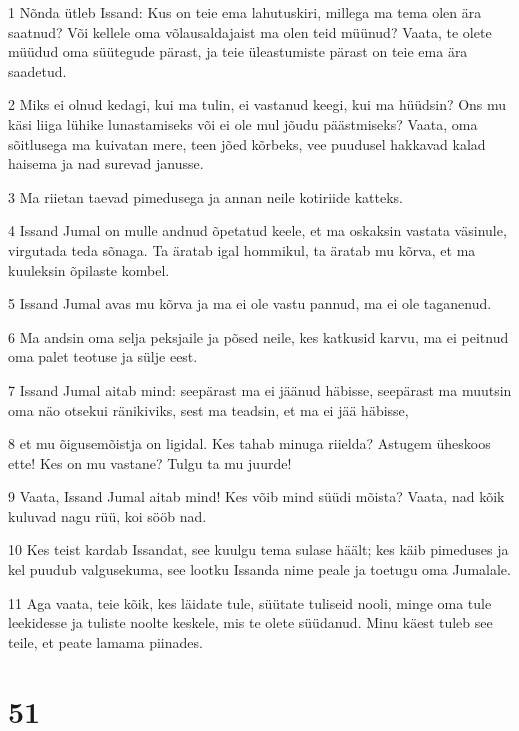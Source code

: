 \par 1 Nõnda ütleb Issand: Kus on teie ema lahutuskiri, millega ma tema olen ära saatnud? Või kellele oma võlausaldajaist ma olen teid müünud? Vaata, te olete müüdud oma süütegude pärast, ja teie üleastumiste pärast on teie ema ära saadetud.
\par 2 Miks ei olnud kedagi, kui ma tulin, ei vastanud keegi, kui ma hüüdsin? Ons mu käsi liiga lühike lunastamiseks või ei ole mul jõudu päästmiseks? Vaata, oma sõitlusega ma kuivatan mere, teen jõed kõrbeks, vee puudusel hakkavad kalad haisema ja nad surevad janusse.
\par 3 Ma riietan taevad pimedusega ja annan neile kotiriide katteks.
\par 4 Issand Jumal on mulle andnud õpetatud keele, et ma oskaksin vastata väsinule, virgutada teda sõnaga. Ta äratab igal hommikul, ta äratab mu kõrva, et ma kuuleksin õpilaste kombel.
\par 5 Issand Jumal avas mu kõrva ja ma ei ole vastu pannud, ma ei ole taganenud.
\par 6 Ma andsin oma selja peksjaile ja põsed neile, kes katkusid karvu, ma ei peitnud oma palet teotuse ja sülje eest.
\par 7 Issand Jumal aitab mind: seepärast ma ei jäänud häbisse, seepärast ma muutsin oma näo otsekui ränikiviks, sest ma teadsin, et ma ei jää häbisse,
\par 8 et mu õigusemõistja on ligidal. Kes tahab minuga riielda? Astugem üheskoos ette! Kes on mu vastane? Tulgu ta mu juurde!
\par 9 Vaata, Issand Jumal aitab mind! Kes võib mind süüdi mõista? Vaata, nad kõik kuluvad nagu rüü, koi sööb nad.
\par 10 Kes teist kardab Issandat, see kuulgu tema sulase häält; kes käib pimeduses ja kel puudub valgusekuma, see lootku Issanda nime peale ja toetugu oma Jumalale.
\par 11 Aga vaata, teie kõik, kes läidate tule, süütate tuliseid nooli, minge oma tule leekidesse ja tuliste noolte keskele, mis te olete süüdanud. Minu käest tuleb see teile, et peate lamama piinades.

\chapter{51}

